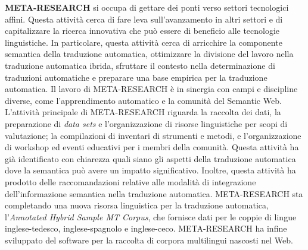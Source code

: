 \documentclass[]{../../metanetpaper}
\begin{document}
\begin{multicols}{2}
\textbf{META-RESEARCH} si occupa di gettare dei ponti verso settori tecnologici affini. Questa attivit\`{a} cerca di fare leva sull'avanzamento in altri settori e di capitalizzare la ricerca innovativa che pu\`{o} essere di beneficio alle tecnologie linguistiche. In particolare, questa attivit\`{a} cerca di arricchire la componente semantica della traduzione automatica, ottimizzare la divisione del lavoro nella traduzione automatica ibrida, sfruttare il contesto nella determinazione di traduzioni automatiche e preparare una base empirica per la traduzione automatica. Il lavoro di META-RESEARCH \`{e} in sinergia con campi e discipline diverse, come l'apprendimento automatico e la comunit\`{a} del Semantic Web. L'attivit\`{a} principale di META-RESEARCH riguarda la raccolta dei dati, la preparazione di \emph{data sets} e l'organizzazione di risorse linguistiche per scopi di valutazione; la compilazioni di inventari di strumenti e metodi, e l'organizzazione di workshop ed eventi educativi per i membri della comunit\`{a}. Questa attivit\`{a} ha gi\`{a} identificato con chiarezza quali siano gli aspetti della traduzione automatica dove la semantica pu\`{o} avere un impatto significativo. Inoltre, questa attivit\`{a} ha prodotto delle raccomandazioni relative alle modalit\`{a} di integrazione dell'informazione semantica nella traduzione automatica. META-RESEARCH sta completando una nuova risorsa linguistica per la traduzione automatica, l'\emph{Annotated Hybrid Sample MT Corpus}, che fornisce dati per le coppie di lingue inglese-tedesco, inglese-spagnolo e inglese-ceco. META-RESEARCH ha infine sviluppato del software per la raccolta di corpora multilingui nascosti nel Web.
\end{multicols}


\setcounter{section}{0}
\setcounter{figure}{0}

\cleardoublepage


\end{document}
